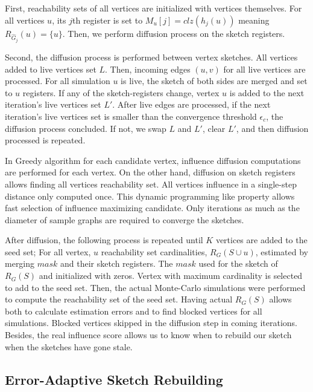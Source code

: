 \documentclass[10pt,journal,compsoc]{IEEEtran}
\begin{document}
First, reachability sets of all vertices are initialized with vertices themselves. For all vertices $u$, its $j$th register is set to $M_u[j]=clz(h_j(u))$ meaning $R_{\hat{G}_j}(u) = \{u\}$. Then, we perform diffusion process on the sketch registers. 

Second, the diffusion process is performed between vertex sketches. All vertices added to live vertices set $L$. Then, incoming edges $(u,v)$ for all live vertices are processed. For all simulation $u$ is live, the sketch of both sides are merged and set to $u$ registers. If any of the sketch-registers change, vertex $u$ is added to the next iteration's live vertices set $L'$. After live edges are processed, if the next iteration's live vertices set is smaller than the convergence threshold $\epsilon_c$, the diffusion process concluded. If not, we swap $L$ and $L'$, clear $L'$, and then diffusion processed is repeated. 

In Greedy algorithm\cite{kempe2003maximizing} for each candidate vertex, influence diffusion computations are performed for each vertex.  On the other hand, diffusion on sketch registers allows finding all vertices reachability set. All vertices influence in a single-step distance only computed once. This dynamic programming like property allows fast selection of influence maximizing candidate. Only iterations as much as the diameter of sample graphs are required to converge the sketches. 


After diffusion, the following process is repeated until $K$ vertices are added to the seed set; For all vertex, $u$ reachability set cardinalities, $R_G(S\cup u)$, estimated by merging $mask$ and their sketch registers. The $mask$ used for the sketch of $R_G(S)$ and initialized with zeros. Vertex with maximum cardinality is selected to add to the seed set. Then, the actual Monte-Carlo simulations were performed to compute the reachability set of the seed set. Having actual $R_G(S)$ allows both to calculate estimation errors and to find blocked vertices for all simulations. Blocked vertices skipped in the diffusion step in coming iterations. Besides, the real influence score allows us to know when to rebuild our sketch when the sketches have gone stale.

\subsection{Error-Adaptive Sketch Rebuilding}
\end{document}
